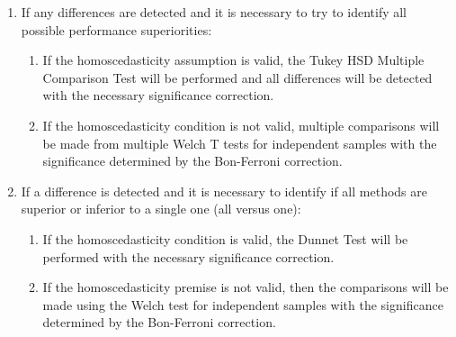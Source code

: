 \begin{enumerate}
\begin{enumerate}
						\item If any differences are detected and it is necessary to try to identify all possible performance superiorities:
						\begin{enumerate}
							\item If the homoscedasticity assumption is valid, the Tukey HSD Multiple Comparison Test will be performed and all differences will be detected with the necessary significance correction.
							\item If the homoscedasticity condition is not valid, multiple comparisons will be made from multiple Welch T tests for independent samples with the significance determined by the Bon-Ferroni correction.
						\end{enumerate}
						\item If a difference is detected and it is necessary to identify if all methods are superior or inferior to a single one (all versus one):
						\begin{enumerate}
							\item If the homoscedasticity condition is valid, the Dunnet Test will be performed with the necessary significance correction.
							\item If the homoscedasticity premise is not valid, then the comparisons will be made using the Welch test for independent samples with the significance determined by the Bon-Ferroni correction.
						\end{enumerate}

\end{enumerate}
\end{enumerate}
